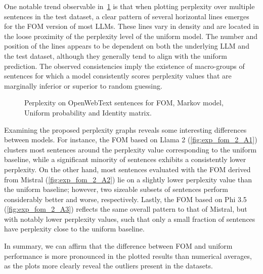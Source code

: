 One notable trend observable in~\cref{fig:exp_fom_2_A} is that when plotting perplexity over multiple sentences in the test dataset, a clear pattern of several horizontal lines emerges for the FOM version of most LLMs.
These lines vary in density and are located in the loose proximity of the perplexity level of the uniform model.
The number and position of the lines appears to be dependent on both the underlying LLM and the test dataset, although they generally tend to align with the uniform prediction.
The observed consistencies imply the existence of macro-groups of sentences for which a model consistently scores perplexity values that are marginally inferior or superior to random guessing.

\begin{figure}[t!]
    \centering
    \quad
    \caption{Perplexity on OpenWebText sentences for FOM, Markov model, Uniform probability and Identity matrix.}
    \label{fig:exp_fom_2_A}
\end{figure}

Examining the proposed perplexity graphs reveals some interesting differences between models.
For instance, the FOM based on Llama 2 (\cref{fig:exp_fom_2_A1}) clusters most sentences around the perplexity value corresponding to the uniform baseline, while a significant minority of sentences exhibits a consistently lower perplexity.
On the other hand, most sentences evaluated with the FOM derived from Mistral (\cref{fig:exp_fom_2_A2}) lie on a slightly lower perplexity value than the uniform baseline; however, two sizeable subsets of sentences perform considerably better and worse, respectively.
Lastly, the FOM based on Phi 3.5 (\cref{fig:exp_fom_2_A3}) reflects the same overall pattern to that of Mistral, but with notably lower perplexity values, such that only a small fraction of sentences have perplexity close to the uniform baseline.

In summary, we can affirm that the difference between FOM and uniform performance is more pronounced in the plotted results than numerical averages, as the plots more clearly reveal the outliers present in the datasets.

